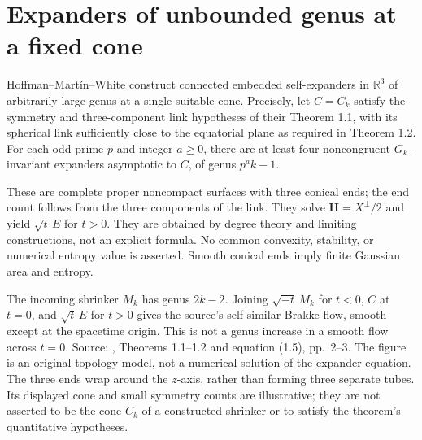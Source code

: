 \chapter{Expanders of unbounded genus at a fixed cone}\label{sec:catalogue-high-genus-expanders}
\begin{example}\label{ex:catalogue-high-genus-expanders}
Hoffman--Mart\'in--White construct connected embedded self-expanders in $\mathbb R^3$ of arbitrarily large genus at a single suitable cone. Precisely, let $C=C_k$ satisfy the symmetry and three-component link hypotheses of their Theorem 1.1, with its spherical link sufficiently close to the equatorial plane as required in Theorem 1.2. For each odd prime $p$ and integer $a\geq0$, there are at least four noncongruent $G_k$-invariant expanders asymptotic to $C$, of genus $p^a k-1$.

These are complete proper noncompact surfaces with three conical ends; the end count follows from the three components of the link. They solve $\mathbf H=X^\perp/2$ and yield $\sqrt t\,E$ for $t>0$. They are obtained by degree theory and limiting constructions, not an explicit formula. No common convexity, stability, or numerical entropy value is asserted. Smooth conical ends imply finite Gaussian area and entropy.

The incoming shrinker $M_k$ has genus $2k-2$. Joining $\sqrt{-t}\,M_k$ for $t<0$, $C$ at $t=0$, and $\sqrt t\,E$ for $t>0$ gives the source's self-similar Brakke flow, smooth except at the spacetime origin. This is not a genus increase in a smooth flow across $t=0$. Source: \cite{CatHMWExpand26}, Theorems 1.1--1.2 and equation (1.5), pp.~2--3. The figure is an original topology model, not a numerical solution of the expander equation. The three ends wrap around the $z$-axis, rather than forming three separate tubes. Its displayed cone and small symmetry counts are illustrative; they are not asserted to be the cone $C_k$ of a constructed shrinker or to satisfy the theorem's quantitative hypotheses.


\end{example}
